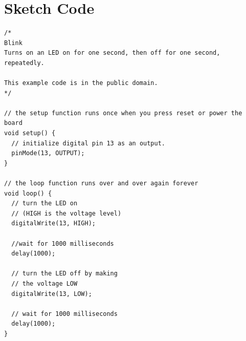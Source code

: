 \newpage
\section*{Sketch Code}
\label{sketch:exp5}
\begin{lstlisting}
/*
Blink
Turns on an LED on for one second, then off for one second, repeatedly.

This example code is in the public domain.
*/

// the setup function runs once when you press reset or power the board
void setup() {
  // initialize digital pin 13 as an output.
  pinMode(13, OUTPUT);
}

// the loop function runs over and over again forever
void loop() {
  // turn the LED on 
  // (HIGH is the voltage level)
  digitalWrite(13, HIGH);
	
  //wait for 1000 milliseconds
  delay(1000);
	
  // turn the LED off by making 
  // the voltage LOW
  digitalWrite(13, LOW);    
	            
  // wait for 1000 milliseconds              
  delay(1000);
}
\end{lstlisting}
\citep{kalif-15-a} \citep{kalif-15-b} \cite{pepi-11}